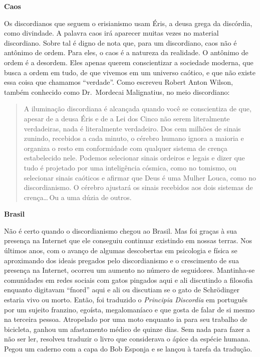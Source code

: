 \begin{flushleft}
{\Large \textbf{Caos}}
\end{flushleft}

\noindent Os discordianos que seguem o erisianismo usam Éris, a deusa grega da discórdia, como divindade. A palavra caos irá aparecer muitas vezes no material discordiano. Sobre tal é dig\-no de nota que, para um discordiano, caos não é antônimo de ordem. Para eles, o caos é a natureza da realidade. O antônimo de ordem é a desordem. Eles apenas querem conscientizar a sociedade moderna, que busca a ordem em tudo, de que vivemos em um universo caótico, e que não existe essa coisa que chamamos ``verdade''. Como escreveu Robert Anton Wilson, também conhecido como Dr.~Mordecai Malignatius, no meio discordiano:

	\begin{quote}
	{\small
	A iluminação discordiana é alcançada quando você se conscientiza de que, apesar de a deusa Éris e de a Lei dos Cinco não serem literalmente verdadeiras, nada é literalmente verdadeiro. Dos cem milhões de sinais zunindo, recebidos a cada minuto, o cérebro humano ignora a maioria e organiza o resto em conformidade com qualquer sistema de crença estabelecido nele. Podemos selecionar sinais ordeiros e legais e dizer que tudo é projetado por uma inteligência cósmica, como no tomismo, ou selecionar sinais caóticos e afirmar que Deus é uma Mulher Louca, como no discordianismo. O cérebro ajustará os sinais recebidos aos dois sistemas de crença\ldots\,Ou a uma dúzia de outros.}
	\end{quote}
 
\begin{flushleft}
{\Large \textbf{Brasil}}
\end{flushleft}

\noindent Não é certo quando o discordianismo chegou ao Brasil. Mas foi graças à sua presença na Internet que ele conseguiu continuar existindo em nossas terras. Nos últimos anos, com o avanço de algumas descobertas em psicologia e física se aproximando dos ideais pregados pelo discordianismo e o crescimento de sua presença na Internet, ocorreu um aumento no número de seguidores.  Mantinha-se comunidades em redes sociais com gatos pingados aqui e ali discutindo a filosofia enquanto digitavam ``fnord'' aqui e ali ou discutiam se o gato de Schrödinger estaria vivo ou morto. Então, foi traduzido o \emph{Principia Discordia} em português por um sujeito franzino, egoísta, megalomaníaco e que gosta de falar de si mesmo na terceira pessoa. Atropelado por uma moto enquanto ia para seu trabalho de bicicleta, ganhou um afastamento médico de quinze dias. Sem nada para fazer a não ser ler, resolveu traduzir o livro que considerava o ápice da espécie humana. Pegou um caderno com a capa do Bob Esponja e se lançou à tarefa da tradução.

